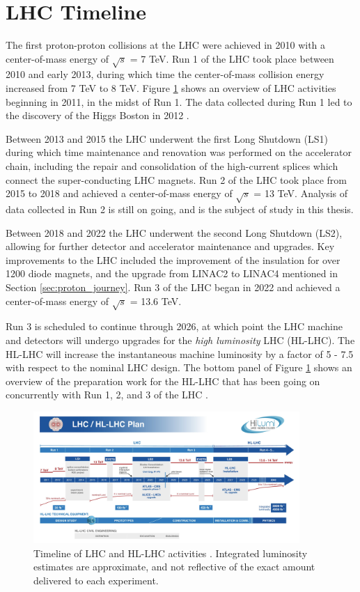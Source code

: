 \section{LHC Timeline}
The first proton-proton collisions at the LHC were achieved in 2010 with a center-of-mass energy of $\sqrt{s}$ = 7 TeV. Run 1 of the LHC took place between 2010 and early 2013, during which time the center-of-mass collision energy increased from 7 TeV to 8 TeV. Figure \ref{fig:lhc_timeline} shows an overview of LHC activities beginning in 2011, in the midst of Run 1. The data collected during Run 1 led to the discovery of the Higgs Boston in 2012 \cite{higgs_paper}. \par

Between 2013 and 2015 the LHC underwent the first Long Shutdown (LS1) during which time maintenance and renovation was performed on the accelerator chain, including the repair and consolidation of the high-current splices which connect the super-conducting LHC magnets. Run 2 of the LHC took place from 2015 to 2018 and achieved a center-of-mass energy of $\sqrt{s}$ = 13 TeV. Analysis of data collected in Run 2 is still on going, and is the subject of study in this thesis. \par

Between 2018 and 2022 the LHC underwent the second Long Shutdown (LS2), allowing for further detector and accelerator maintenance and upgrades. Key improvements to the LHC included the improvement of the insulation for over 1200 diode magnets, and the upgrade from LINAC2 to LINAC4 mentioned in Section \ref{sec:proton_journey}. Run 3 of the LHC began in 2022 and achieved a center-of-mass energy of $\sqrt{s}$ = 13.6 TeV. \par

Run 3 is scheduled to continue through 2026, at which point the LHC machine and detectors will undergo upgrades for the \textit{high luminosity} LHC (HL-LHC). The HL-LHC will increase the instantaneous machine luminosity by a factor of 5 - 7.5 with respect to the nominal LHC design. The bottom panel of Figure \ref{fig:lhc_timeline} shows an overview of the preparation work for the HL-LHC that has been going on concurrently with Run 1, 2, and 3 of the LHC \cite{hl_lhc}. 

\begin{figure}
        \centering
	\includegraphics[width=0.9\textwidth]{figures/ch3/hl_lhc_timeline.png}
	\caption{Timeline of LHC and HL-LHC activities \cite{lhc_timeline}. Integrated luminosity estimates are approximate, and not reflective of the exact amount delivered to each experiment.}
	\label{fig:lhc_timeline}
\end{figure}
